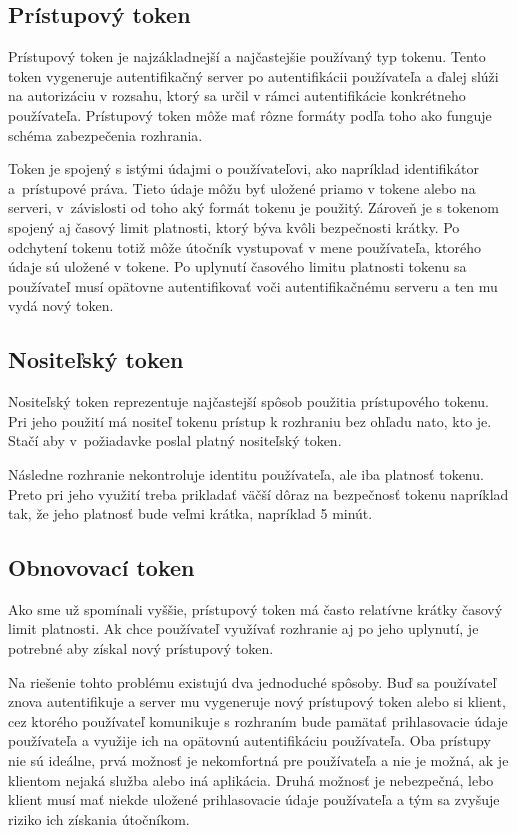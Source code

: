 \subsection{Prístupový token}

Prístupový token \cite{access_token} je najzákladnejší a najčastejšie používaný typ tokenu. Tento token vygeneruje autentifikačný server po autentifikácii používateľa a ďalej slúži na autorizáciu v rozsahu, ktorý sa určil v rámci autentifikácie konkrétneho používateľa. Prístupový token môže mať rôzne formáty podľa toho ako funguje schéma zabezpečenia rozhrania.

Token je spojený s istými údajmi o používateľovi, ako napríklad identifikátor a~prístupové práva. Tieto údaje môžu byť uložené priamo v tokene alebo na serveri, v~závislosti od toho aký formát tokenu je použitý. Zároveň je s tokenom spojený aj časový limit platnosti, ktorý býva kvôli bezpečnosti krátky. Po odchytení tokenu totiž môže útočník vystupovať v mene používateľa, ktorého údaje sú uložené v tokene. Po uplynutí časového limitu platnosti tokenu sa používateľ musí opätovne autentifikovať voči autentifikačnému serveru a ten mu vydá nový token.


\subsection{Nositeľský token}

Nositeľský token reprezentuje najčastejší spôsob použitia prístupového tokenu. Pri jeho použití má nositeľ tokenu prístup k rozhraniu bez ohľadu nato, kto je. Stačí aby v~požiadavke poslal platný nositeľský token.

Následne rozhranie nekontroluje identitu používateľa, ale iba platnosť tokenu. Preto pri jeho využití treba prikladať väčší dôraz na bezpečnosť tokenu napríklad tak, že jeho platnosť bude veľmi krátka, napríklad 5 minút.


\subsection{Obnovovací token}

Ako sme už spomínali vyššie, prístupový token má často relatívne krátky časový limit platnosti. Ak chce používateľ využívať rozhranie aj po jeho uplynutí, je potrebné aby získal nový prístupový token.

Na riešenie tohto problému existujú dva jednoduché spôsoby. Buď sa používateľ znova autentifikuje a server mu vygeneruje nový prístupový token alebo si klient, cez ktorého používateľ komunikuje s rozhraním bude pamätať prihlasovacie údaje používateľa a využije ich na opätovnú autentifikáciu používateľa. Oba prístupy nie sú ideálne, prvá možnosť je nekomfortná pre používateľa a nie je možná, ak je klientom nejaká služba alebo iná aplikácia. Druhá možnosť je nebezpečná, lebo klient musí mať niekde uložené prihlasovacie údaje používateľa a tým sa zvyšuje riziko ich získania útočníkom.

